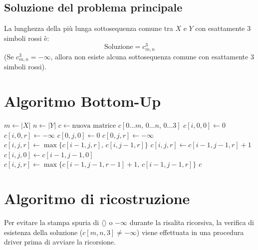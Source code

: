 \subsection{Soluzione del problema principale}
La lunghezza della più lunga sottosequenza comune tra $X$ e $Y$ con esattamente $3$ simboli rossi è:
\[
    \text{Soluzione} = c_{m, n}^3
\]
(Se $c_{m,n}^3 = -\infty$, allora non esiste alcuna sottosequenza comune con esattamente $3$ simboli rossi).

\section{Algoritmo Bottom-Up}
\begin{algorithm}[htbp]
\caption{Calcolo Bottom-Up per LCS con esattamente 3 simboli rossi}
\begin{algorithmic}[1]
    \State $m \gets |X|$
    \State $n \gets |Y|$
    \State $c \gets \text{nuova matrice } c[0 \dots m, \, 0 \dots n, \, 0 \dots 3]$
        \State $c[i, 0, 0] \gets 0$
            \State $c[i, 0, r] \gets -\infty$
        \EndFor
    \EndFor
        \State $c[0, j, 0] \gets 0$
            \State $c[0, j, r] \gets -\infty$
        \EndFor
    \EndFor
                    \State $c[i, j, r] \gets \max \{ c[i-1, j, r], \, c[i, j-1, r] \}$
                \Else
                        \State $c[i, j, r] \gets c[i-1, j-1, r] + 1$
                    \Else
                            \State $c[i, j, 0] \gets c[i-1, j-1, 0]$
                        \Else
                            \State $c[i, j, r] \gets \max \{ c[i-1, j-1, r-1] + 1, \, c[i-1, j-1, r] \}$
                        \EndIf
                    \EndIf
                \EndIf
            \EndFor
        \EndFor
    \EndFor
    \State \Return $c$
\EndProcedure
\end{algorithmic}
\end{algorithm}

\section{Algoritmo di ricostruzione}
Per evitare la stampa spuria di $\langle \rangle$ o $-\infty$ durante la risalita ricorsiva, la verifica di esistenza della soluzione ($c[m,n,3] \neq -\infty$) viene effettuata in una procedura driver prima di avviare la ricorsione.

